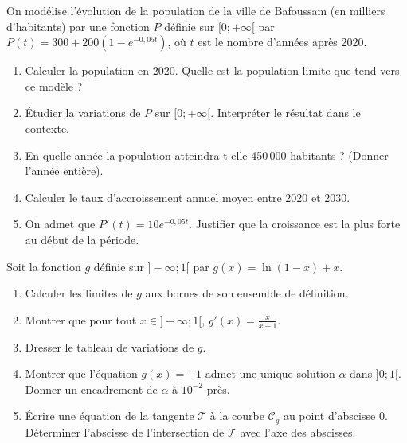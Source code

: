 \documentclass[11pt]{article}
\begin{document}
\begin{exercice}
On modélise l'évolution de la population de la ville de Bafoussam (en milliers d'habitants) par une fonction $P$ définie sur $[0; +\infty[$ par $P(t) = 300 + 200(1 - e^{-0,05t})$, où $t$ est le nombre d'années après 2020.
\begin{enumerate}
    \item Calculer la population en 2020. Quelle est la population limite que tend vers ce modèle ?
    \item Étudier la variations de $P$ sur $[0; +\infty[$. Interpréter le résultat dans le contexte.
    \item En quelle année la population atteindra-t-elle 450\,000 habitants ? (Donner l'année entière).
    \item Calculer le taux d'accroissement annuel moyen entre 2020 et 2030.
    \item On admet que $P'(t) = 10e^{-0,05t}$. Justifier que la croissance est la plus forte au début de la période.
\end{enumerate}
\end{exercice}

\begin{exercice}
Soit la fonction $g$ définie sur $]-\infty; 1[$ par $g(x) = \ln(1 - x) + x$.
\begin{enumerate}
    \item Calculer les limites de $g$ aux bornes de son ensemble de définition.
    \item Montrer que pour tout $x \in ]-\infty; 1[$, $g'(x) = \frac{x}{x-1}$.
    \item Dresser le tableau de variations de $g$.
    \item Montrer que l'équation $g(x) = -1$ admet une unique solution $\alpha$ dans $]0; 1[$. Donner un encadrement de $\alpha$ à $10^{-2}$ près.
    \item Écrire une équation de la tangente $\mathcal{T}$ à la courbe $\mathcal{C}_g$ au point d'abscisse $0$. Déterminer l'abscisse de l'intersection de $\mathcal{T}$ avec l'axe des abscisses.
\end{enumerate}
\end{exercice}
\end{document}
